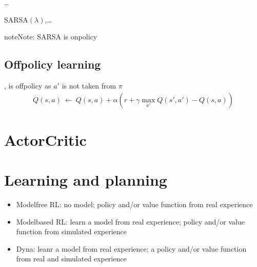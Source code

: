 \documentclass[letterpaper,10pt,english]{jupyterBook}
\begin{document}
\sphinxAtStartPar
…

\sphinxAtStartPar
{} SARSA\((\lambda)\),…

\begin{sphinxadmonition}{note}{Note:}
\sphinxAtStartPar
SARSA is on\sphinxhyphen{}policy
\end{sphinxadmonition}


\subsection{Off\sphinxhyphen{}policy learning}
\label{\detokenize{ch/rl/mdp_sol_rl:off-policy-learning}}
\sphinxAtStartPar
{}, is off\sphinxhyphen{}policy as \(a'\) is not taken from \(\pi\)
\begin{equation*}
\begin{split}Q(s,a) \ \leftarrow \ Q(s,a) + \alpha \left( r + \gamma \max_{a'} Q(s',a') - Q(s,a) \right)\end{split}
\end{equation*}

\section{Actor\sphinxhyphen{}Critic}
\label{\detokenize{ch/rl/mdp_sol_rl:actor-critic}}\label{\detokenize{ch/rl/mdp_sol_rl:rl-mdp-sol-rl-ac}}
\sphinxAtStartPar
{}


\section{Learning and planning}
\label{\detokenize{ch/rl/mdp_sol_rl:learning-and-planning}}\begin{itemize}
\item {} 
\sphinxAtStartPar
Model\sphinxhyphen{}free RL: no model;  policy and/or value function from real experience

\item {} 
\sphinxAtStartPar
Model\sphinxhyphen{}based RL: learn a model from real experience;  policy and/or value function from simulated experience

\item {} 
\sphinxAtStartPar
Dyna: leanr a model from real experience;  a policy and/or value function from real and simulated experience

\end{itemize}
\end{document}
